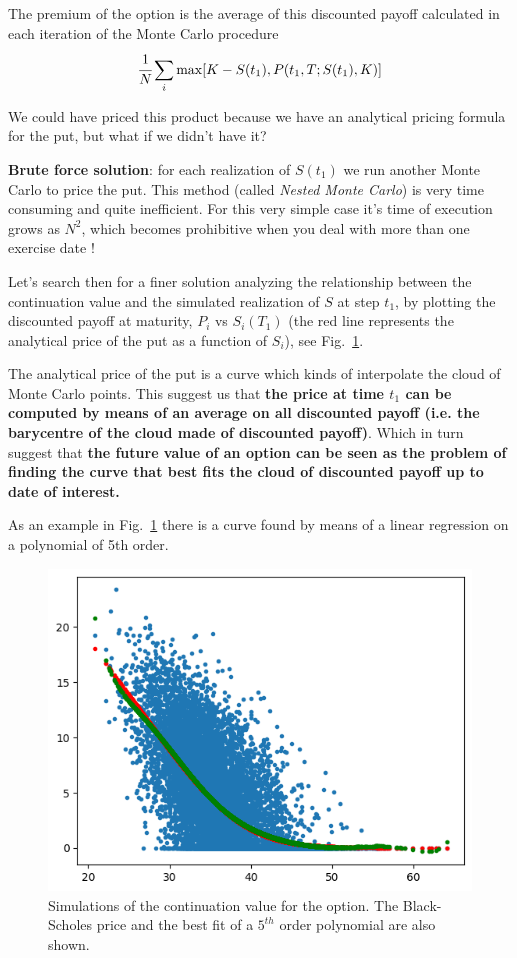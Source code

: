 \documentclass[12pt,a4paper]{book}
\begin{document}
The premium of the option is the average of this discounted payoff calculated in each iteration of the Monte Carlo procedure
\begin{equation}
	\cfrac{1}{N}\sum_i\max[K-S(t_1), P(t_1,T;S(t_1),K)]
\end{equation}

We could have priced this product because we have an analytical pricing formula for the put, but what if we didn't have it?

\textbf{Brute force solution}: for each realization of $S(t_1)$ we run another Monte Carlo to price the put. This method (called \emph{Nested Monte Carlo}) is very time consuming and quite inefficient. For this very simple case it's time of execution grows as $N^2$, which becomes prohibitive when you deal with more than one exercise date !

Let's search then for a finer solution analyzing the relationship between the continuation value and the simulated realization of $S$ at step $t_1$, by plotting the discounted payoff at maturity, $P_i$ vs $S_i(T_1)$ (the red line represents the analytical price of the put as a function of $S_i$), see Fig.~\ref{fig:continuation_function}.


The analytical price of the put is a curve which kinds of interpolate the cloud of Monte Carlo points. This suggest us that
\textbf{the price at time $t_1$ can be computed by means of an average on all discounted payoff (i.e. the barycentre of the cloud made of discounted payoff)}.
Which in turn suggest that \textbf{the future value of an option can be seen as the problem of finding the curve that best fits the cloud of discounted payoff up to date of interest.}

As an example in Fig.~\ref{fig:continuation_function} there is a curve found by means of a linear regression on a polynomial of 5th order.

\begin{figure}[htbp]
	\begin{center}
		\includegraphics[width=0.5\linewidth]{addons/continuation_function}
	\end{center}
	\caption{Simulations of the continuation value for the option. The Black-Scholes price and the best fit of a $5^{th}$ order polynomial are also shown.}
	\label{fig:continuation_function}
\end{figure}
\end{document}
